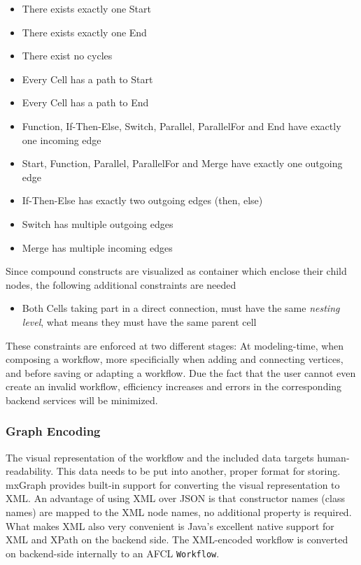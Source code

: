 \documentclass[a4paper,12pt,pdftex,halfparskip,cleardoubleempty,bibtotoc,liststotoc]{scrbook}
\begin{document}
\begin{itemize}
	\item There exists exactly one \textsf{Start}
	\item There exists exactly one \textsf{End}
	\item There exist no cycles
    \item Every \textsf{Cell} has a path to \textsf{Start}
    \item Every \textsf{Cell} has a path to \textsf{End}
	\item \textsf{Function}, \textsf{If-Then-Else}, \textsf{Switch}, \textsf{Parallel}, \textsf{ParallelFor} and \textsf{End} have exactly one incoming edge
	\item \textsf{Start}, \textsf{Function}, \textsf{Parallel}, \textsf{ParallelFor} and \textsf{Merge} have exactly one outgoing edge
	\item \textsf{If-Then-Else} has exactly two outgoing edges (then, else)
	\item \textsf{Switch} has multiple outgoing edges
	\item \textsf{Merge} has multiple incoming edges
\end{itemize}

Since compound constructs are visualized as container which enclose their child nodes, the following additional constraints are needed

\begin{itemize}
	\item Both \textsf{Cell}s taking part in a direct connection, must have the same \textit{nesting level}, what means they must have the same parent cell
\end{itemize}

These constraints are enforced at two different stages: At modeling-time, when composing a workflow, more specificially when adding and connecting vertices, and before saving or adapting a workflow.
Due the fact that the user cannot even create an invalid workflow, efficiency increases and errors in the corresponding backend services will be minimized.


\subsubsection{Graph Encoding}

The visual representation of the workflow and the included data targets human-readability. This data needs to be put into another, proper format for storing. mxGraph provides built-in support for converting the visual representation to XML. An advantage of using XML over JSON is that constructor names (class names) are mapped to the XML node names, no additional property is required.
What makes XML also very convenient is Java's excellent native support for XML and XPath on the backend side. The XML-encoded workflow is converted on backend-side internally to an AFCL \texttt{Workflow}.
\end{document}
